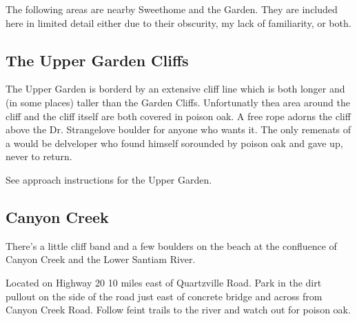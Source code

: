 

















\raggedcolumns
\begin{multicols}{2}



The following areas are nearby Sweethome and the Garden. They are included here in limited detail either due to their obscurity, my lack of familiarity, or both.\\








\needspace{1.5cm}
\subsection*{The Upper Garden Cliffs}\label{bf:The Upper Garden Cliffs}
The Upper Garden is borderd by an extensive cliff line which is both longer and (in some places) taller than the Garden Cliffs. Unfortunatly thea area around the cliff and the cliff itself are both covered in poison oak. A free rope adorns the cliff above the Dr. Strangelove boulder for anyone who wants it. The only remenats of a would be delveloper who found himself sorounded by poison oak and gave up, never to return.

See approach instructions for the Upper Garden.\\
	



\needspace{1.5cm}
\subsection*{Canyon Creek}\label{bf:Canyon Creek}
There's a little cliff band and a few boulders on the beach at the confluence of Canyon Creek and the Lower Santiam River.

Located on Highway 20 10 miles east of Quartzville Road. Park in the dirt pullout on the side of the road just east of concrete bridge and across from Canyon Creek Road. Follow feint trails to the river and watch out for poison oak.\\
	



\needspace{1.5cm}

\end{multicols}
